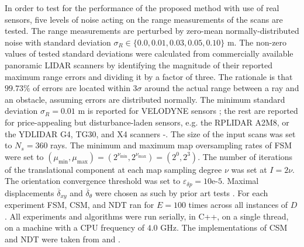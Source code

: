 In order to test for the performance of the proposed method with use of real
sensors, five levels of noise acting on the range measurements of the scans are
tested. The range measurements are perturbed by zero-mean normally-distributed
noise with standard deviation $\sigma_R \in \{0.0, 0.01, 0.03, 0.05, 0.10\}$ m.
The non-zero values of tested standard deviations were calculated from
commercially available panoramic LIDAR scanners by identifying the magnitude of
their reported maximum range errors and dividing it by a factor of three. The
rationale is that $99.73\%$ of errors are located within $3\sigma$ around the
actual range between a ray and an obstacle, assuming errors are distributed
normally. The minimum standard deviation $\sigma_R = 0.01$ m is reported for
VELODYNE sensors \cite{velodyne_datasheet}; the rest are reported for
price-appealing but disturbance-laden sensors, e.g. the RPLIDAR A2M8, or the
YDLIDAR G4, TG30, and X4 scanners \cite{a2m8_datasheet}-\cite{x4_datasheet}. The
size of the input scans was set to $N_s=360$ rays. The minimum and maximum map
oversampling rates of FSM were set to $(\mu_{\min},\mu_{\max}) =
(2^{\nu_{\min}},2^{\nu_{\max}}) = (2^0,2^3)$. The number of iterations of the
translational component at each map sampling degree $\nu$ was set at $I =
2\nu$. The orientation convergence threshold was set to $\varepsilon_{\delta p}
= 10$e-$5$. Maximal displacements $\overline{\delta}_{xy}$ and
$\overline{\delta}_\theta$ were chosen as such by prior art tests \cite{plicp}.
For each experiment FSM, CSM, and NDT ran for $E = 100$ times across all
instances of $D$. All experiments and algorithms were run serially, in C++, on
a single thread, on a machine with a CPU frequency of $4.0$ GHz. The
implementations of CSM and NDT were taken from \cite{csm_implementation} and
\cite{ndt_implementation}.
